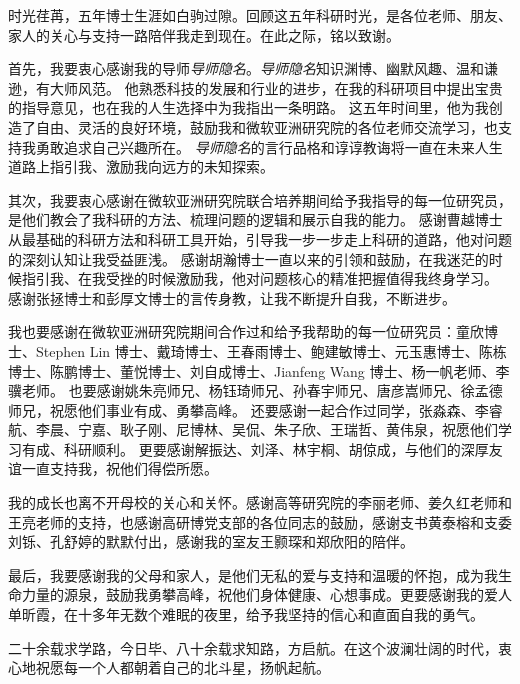 
\begin{acknowledgements}
  时光荏苒，五年博士生涯如白驹过隙。回顾这五年科研时光，是各位老师、朋友、家人的关心与支持一路陪伴我走到现在。在此之际，铭以致谢。


  首先，我要衷心感谢我的导师\textit{导师隐名}。\textit{导师隐名}知识渊博、幽默风趣、温和谦逊，有大师风范。
  他熟悉科技的发展和行业的进步，在我的科研项目中提出宝贵的指导意见，也在我的人生选择中为我指出一条明路。
  这五年时间里，他为我创造了自由、灵活的良好环境，鼓励我和微软亚洲研究院的各位老师交流学习，也支持我勇敢追求自己兴趣所在。
  \textit{导师隐名}的言行品格和谆谆教诲将一直在未来人生道路上指引我、激励我向远方的未知探索。
  
  其次，我要衷心感谢在微软亚洲研究院联合培养期间给予我指导的每一位研究员，是他们教会了我科研的方法、梳理问题的逻辑和展示自我的能力。
  感谢曹越博士从最基础的科研方法和科研工具开始，引导我一步一步走上科研的道路，他对问题的深刻认知让我受益匪浅。
  感谢胡瀚博士一直以来的引领和鼓励，在我迷茫的时候指引我、在我受挫的时候激励我，他对问题核心的精准把握值得我终身学习。
  感谢张拯博士和彭厚文博士的言传身教，让我不断提升自我，不断进步。

  我也要感谢在微软亚洲研究院期间合作过和给予我帮助的每一位研究员：童欣博士、Stephen Lin 博士、戴琦博士、王春雨博士、鲍建敏博士、元玉惠博士、陈栋博士、陈鹏博士、董悦博士、刘自成博士、Jianfeng Wang 博士、杨一帆老师、李骥老师。
  也要感谢姚朱亮师兄、杨钰琦师兄、孙春宇师兄、唐彦嵩师兄、徐孟德师兄，祝愿他们事业有成、勇攀高峰。
  还要感谢一起合作过同学，张淼森、李睿航、李晨、宁嘉、耿子刚、尼博林、吴侃、朱子欣、王瑞哲、黄伟泉，祝愿他们学习有成、科研顺利。
  更要感谢解振达、刘泽、林宇桐、胡倞成，与他们的深厚友谊一直支持我，祝他们得偿所愿。

  我的成长也离不开母校的关心和关怀。感谢高等研究院的李丽老师、姜久红老师和王亮老师的支持，也感谢高研博党支部的各位同志的鼓励，感谢支书黄泰榕和支委刘铄、孔舒婷的默默付出，感谢我的室友王颢琛和郑欣阳的陪伴。

  最后，我要感谢我的父母和家人，是他们无私的爱与支持和温暖的怀抱，成为我生命力量的源泉，鼓励我勇攀高峰，祝他们身体健康、心想事成。更要感谢我的爱人单昕霞，在十多年无数个难眠的夜里，给予我坚持的信心和直面自我的勇气。

  二十余载求学路，今日毕、八十余载求知路，方启航。在这个波澜壮阔的时代，衷心地祝愿每一个人都朝着自己的北斗星，扬帆起航。
  
  
\end{acknowledgements}
